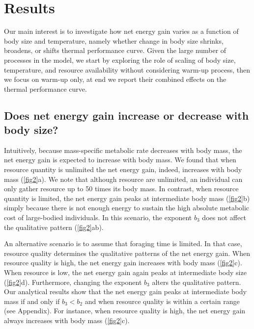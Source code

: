 \section*{Results}
Our main interest is to investigate how net energy gain varies as a function of body size and temperature, namely whether change in body size shrinks, broadens, or shifts thermal performance curve.
Given the large number of processes in the model, we start by exploring the role of scaling of body size, temperature, and resource availability without considering warm-up process, then we focus on warm-up only, at end we report their combined effects on the thermal performance curve.

\subsection*{Does net energy gain increase or decrease with body size?}
Intuitively, because mass-specific metabolic rate decreases with body mass, the net energy gain is expected to increase with body mass.
We found that when resource quantity is unlimited the net energy gain, indeed, increases with body mass (\cref{fig2}a).
We note that although resource are unlimited, an individual can only gather resource up to 50 times its body mass.
In contrast, when resource quantity is limited, the net energy gain peaks at intermediate body mass (\cref{fig2}b) simply because there is not enough energy to sustain the high absolute metabolic cost of large-bodied individuals.
In this scenario, the exponent $b_3$ does not affect the qualitative pattern (\cref{fig2}ab).

An alternative scenario is to assume that foraging time is limited.
In that case, resource quality determines the qualitative patterns of the net energy gain.
When resource quality is high, the net energy gain increases with body mass (\cref{fig2}c).
When resource is low, the net energy gain again peaks at intermediate body size (\cref{fig2}d).
Furthermore, changing the exponent $b_3$ alters the qualitative pattern.
Our analytical results show that the net energy gain peaks at intermediate body mass if and only if $b_3 < b_2$ and when resource quality is within a certain range (see Appendix).
For instance, when resource quality is high, the net energy gain always increases with body mass (\cref{fig2}c).

